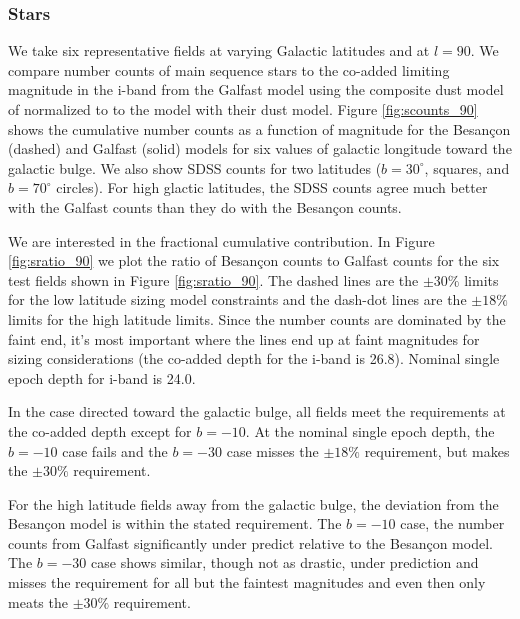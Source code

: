 \documentclass[]{article}
\begin{document}
\subsubsection{Stars}
We take six representative fields at varying Galactic latitudes and at
$l=90$.  We compare number counts of main sequence stars to
the co-added limiting magnitude in the i-band from the Galfast model
\citep{XXX} using the composite dust model of \citet{amores05}
normalized to \citet{schlegel98} to the \citet{besancon} model with
their dust model.  Figure \ref{fig:scounts_90} shows the cumulative
number counts as a function of magnitude for the Besan\c{c}on (dashed)
and Galfast (solid) models for six values of galactic longitude toward
the galactic bulge.  We also show SDSS counts for two latitudes 
($b=30^{\circ}$, squares, and $b=70^{\circ}$ circles).  For high glactic
latitudes, the SDSS counts agree much better with the Galfast counts
than they do with the Besan\c{c}on counts.

We are interested in the fractional cumulative
contribution.  
In Figure \ref{fig:sratio_90} we plot the ratio of
Besan\c{c}on counts to Galfast counts for the six test fields shown in
Figure \ref{fig:sratio_90}.  The dashed lines are the $\pm30\%$ limits
for the low latitude sizing model constraints and the dash-dot lines
are the $\pm18\%$ limits for the high latitude limits.  Since the
number counts are dominated by the faint end, it's most important
where the lines end up at faint magnitudes for sizing considerations
(the co-added depth for the i-band is 26.8).  Nominal single epoch
depth for i-band is 24.0.

In the case directed toward the galactic bulge, all fields meet the
requirements at the co-added depth except for $b=-10$.  At the nominal
single epoch depth, the $b=-10$ case fails and the $b=-30$ case misses
the $\pm18\%$ requirement, but makes the $\pm30\%$ requirement.

For the high latitude fields away from the galactic bulge, the
deviation from the Besan\c{c}on model is within the stated
requirement.  The $b=-10$ case, the number counts from Galfast
significantly under predict relative to the Besan\c{c}on model.  The
$b=-30$ case shows similar, though not as drastic, under prediction
and misses the requirement for all but the faintest magnitudes and
even then only meats the $\pm30\%$ requirement.

\end{document}
